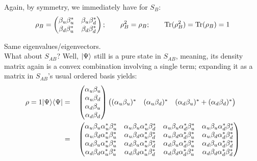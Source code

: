 \documentclass[solutions.tex]{subfiles}
\begin{document}
Again, by symmetry, we immediately have for $S_B$:
\[
	\rho_B = \begin{pmatrix}
		\beta_u\beta_u^* & \beta_u\beta_d^* \\
		\beta_d\beta_u^* & \beta_d\beta_d^* \\
	\end{pmatrix};\qquad
	\rho_B^2 = \rho_B;\qquad \text{Tr}(\rho_B^2) = \text{Tr}(\rho_B) = 1
\]

Same eigenvalues/eigenvectors. \\

What about $S_{AB}$? Well, $|\Psi\rangle$ still is a pure state in $S_{AB}$,
meaning, its density matrix again is a convex combination involving
a single term; expanding it as a matrix in $S_{AB}$'s usual ordered basis
yields:
\begin{equation*}\begin{aligned}
	\rho = 1|\Psi\rangle\langle \Psi| &=&& \begin{pmatrix}
		\alpha_u\beta_u \\
		\alpha_u\beta_d \\
		\alpha_d\beta_u \\
		\alpha_d\beta_d \\
	\end{pmatrix}\begin{pmatrix}
		(\alpha_u\beta_u)^* & (\alpha_u\beta_d)^* &
			(\alpha_d\beta_u)^* + (\alpha_d\beta_d)^*
	\end{pmatrix} \\
	~ &=&& \begin{pmatrix}
		\alpha_u\beta_u\alpha_u^*\beta_u^*
			& \alpha_u\beta_u\alpha_u^*\beta_d^*
			& \alpha_u\beta_u\alpha_d^*\beta_u^*
			& \alpha_u\beta_u\alpha_d^*\beta_d^* \\
		\alpha_u\beta_d\alpha_u^*\beta_u^*
			& \alpha_u\beta_d\alpha_u^*\beta_d^*
			& \alpha_u\beta_d\alpha_d^*\beta_u^*
			& \alpha_u\beta_d\alpha_d^*\beta_d^* \\
		\alpha_d\beta_u\alpha_u^*\beta_u^*
			& \alpha_d\beta_u\alpha_u^*\beta_d^*
			& \alpha_d\beta_u\alpha_d^*\beta_u^*
			& \alpha_d\beta_u\alpha_d^*\beta_d^* \\
		\alpha_d\beta_d\alpha_u^*\beta_u^*
			& \alpha_d\beta_d\alpha_u^*\beta_d^*
			& \alpha_d\beta_d\alpha_d^*\beta_u^*
			& \alpha_d\beta_d\alpha_d^*\beta_d^* \\
	\end{pmatrix} \\
\end{aligned}\end{equation*}
\end{document}
